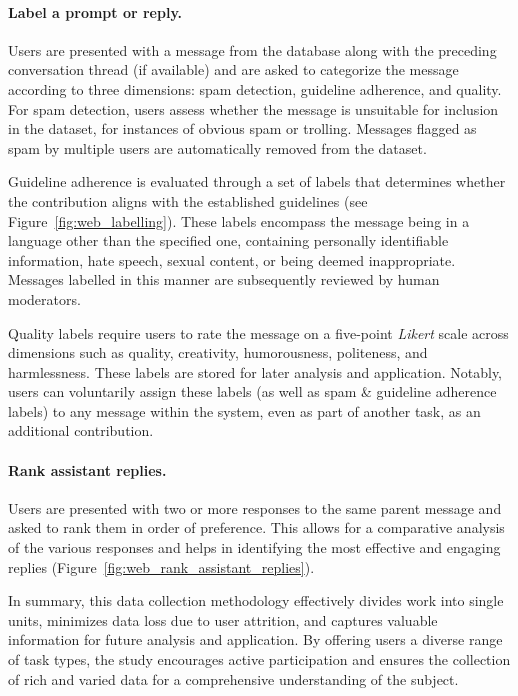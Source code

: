 \paragraph{Label a prompt or reply.}Users are presented with a message from the database along with the preceding conversation thread (if available) and are asked to categorize the message according to three dimensions: spam detection, guideline adherence, and quality. For spam detection, users assess whether the message is unsuitable for inclusion in the dataset, for instances of obvious spam or trolling. Messages flagged as spam by multiple users are automatically removed from the dataset.

Guideline adherence is evaluated through a set of labels that determines whether the contribution aligns with the established guidelines (see Figure~\ref{fig:web_labelling}). These labels encompass the message being in a language other than the specified one, containing personally identifiable information, hate speech, sexual content, or being deemed inappropriate. Messages labelled in this manner are subsequently reviewed by human moderators.

Quality labels require users to rate the message on a five-point \textit{Likert} scale across dimensions such as quality, creativity, humorousness, politeness, and harmlessness. These labels are stored for later analysis and application. Notably, users can voluntarily assign these labels (as well as spam \& guideline adherence labels) to any message within the system, even as part of another task, as an additional contribution.

\paragraph{Rank assistant replies.}Users are presented with two or more responses to the same parent message and asked to rank them in order of preference. This allows for a comparative analysis of the various responses and helps in identifying the most effective and engaging replies (Figure~\ref{fig:web_rank_assistant_replies}).

In summary, this data collection methodology effectively divides work into single units, minimizes data loss due to user attrition, and captures valuable information for future analysis and application. By offering users a diverse range of task types, the study encourages active participation and ensures the collection of rich and varied data for a comprehensive understanding of the subject.

